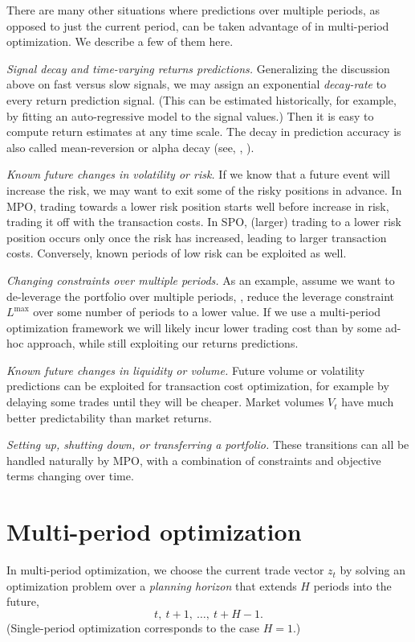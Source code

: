 \documentclass[openany]{now}
\begin{document}
There are many other situations where predictions over multiple periods,
as opposed to just the current period, can be taken advantage of in
multi-period optimization.  We describe a few of them here.
\BIT
\item \emph{Signal decay and time-varying returns predictions.}
Generalizing the discussion above on fast versus slow signals,
we may assign an exponential \emph{decay-rate} to every
return prediction signal. (This can be estimated historically,
for example, by fitting an auto-regressive model to the signal values.)
Then it is easy to compute return estimates at any time scale.
The decay in prediction accuracy is also called mean-reversion
or alpha decay (see, \eg, \cite{campbell1997econometrics,grinold2006dynamic,garleanu2013dynamic}).
\item \emph{Known future changes in volatility or risk.}
If we know that a future event will increase the risk, we may want
to exit some of the risky positions in advance.
In MPO, trading
towards a lower risk position starts well before increase in risk,
trading it off with the transaction costs.
In SPO, (larger) trading to a lower risk position occurs only once the
risk has increased, leading to larger transaction costs.
Conversely, known periods of low risk can be exploited as well.
\item  \emph{Changing constraints over multiple periods.}
As an example, assume we want to de-leverage the portfolio over
multiple periods, \ie, reduce the leverage constraint $L^\mathrm{max}$ over some number
of periods to a lower value.
If we use a multi-period optimization framework we will likely
incur lower trading cost than by some ad-hoc approach,
while still exploiting our returns predictions.
\item  \emph{Known future changes in liquidity or volume.}
Future volume or volatility predictions can be exploited for transaction cost optimization,
for example by delaying some trades until they will be cheaper.
Market volumes $V_t$ have much better predictability than market returns.
\item \emph{Setting up, shutting down, or transferring a portfolio.}
These transitions can all be handled naturally by MPO,
with a combination of constraints and objective terms changing over time.
\EIT

\section{Multi-period optimization}
In multi-period optimization, we choose the current trade vector
$z_t$ by solving
an optimization problem over a \emph{planning horizon}
that extends $H$ periods into the future,
\[
t,~t+1, ~ \ldots, ~ t+H-1.
\]
(Single-period optimization corresponds to the case $H=1$.)
\end{document}
